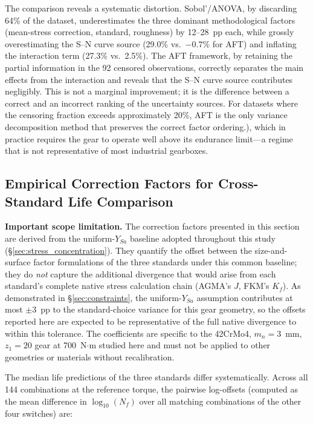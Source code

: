 \documentclass[12pt,a4paper]{article}
\begin{document}
The comparison reveals a systematic distortion. Sobol'/ANOVA, by
discarding 64\% of the dataset, underestimates the three dominant
methodological factors (mean-stress correction, standard, roughness)
by 12--28~pp each, while grossly overestimating the S--N curve source
(29.0\% vs.\ $-0.7$\% for AFT) and inflating the interaction term
(27.3\% vs.\ 2.5\%). The AFT framework, by retaining the partial
information in the 92 censored observations, correctly separates the
main effects from the interaction and reveals that the S--N curve
source contributes negligibly. This is not a marginal improvement;
it is the difference between a correct and an incorrect ranking of the
uncertainty sources. For datasets where the censoring fraction exceeds
approximately 20\%, AFT is the only variance decomposition method that
preserves the correct factor ordering.), which in practice
requires the gear to operate well above its endurance limit---a regime
that is not representative of most industrial gearboxes.

\subsection{Empirical Correction Factors for Cross-Standard Life Comparison}

\textbf{Important scope limitation.} The correction factors presented
in this section are derived from the uniform-$Y_{Sa}$ baseline
adopted throughout this study (\S\ref{sec:stress_concentration}). They
quantify the offset between the size-and-surface factor formulations
of the three standards under this common baseline; they do \emph{not}
capture the additional divergence that would arise from each
standard's complete native stress calculation chain (AGMA's $J$,
FKM's $K_f$). As demonstrated in \S\ref{sec:constraints}, the
uniform-$Y_{Sa}$ assumption contributes at most $\pm$3~pp to the
standard-choice variance for this gear geometry, so the offsets
reported here are expected to be representative of the full native
divergence to within this tolerance. The coefficients are specific
to the 42CrMo4, $m_n=3$~mm, $z_1=20$ gear at 700~N$\cdot$m
studied here and must not be applied to other geometries or materials
without recalibration.

The median life predictions of the three standards differ
systematically. Across all 144 combinations at the reference torque,
the pairwise log-offsets (computed as the mean difference in
$\log_{10}(N_f)$ over all matching combinations of the other four
switches) are:
\end{document}
